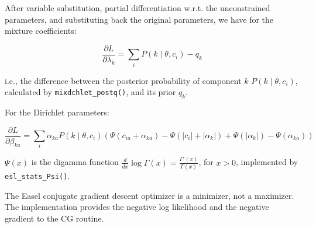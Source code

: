 \documentclass[11pt]{article}
\newcommand{\mono}[1]{{\smaller\texttt{#1}}}                    %
\begin{document}
After variable substitution, partial differentiation w.r.t. the
unconstrained parameters, and substituting back the original
parameters, we have for the mixture coefficients:

\[
  \frac{\partial L}{\partial \lambda_k} = \sum_i P(k \mid \theta, c_i) - q_k
\]

i.e., the difference between the posterior probability of component
$k$ $P(k \mid \theta, c_i)$, calculated by \mono{mixdchlet\_postq()},
and its prior $q_k$.

For the Dirichlet parameters:

\[
\frac{\partial L}{\partial \beta_{ka}}  =  \sum_i
 \alpha_{ka} P(k \mid \theta, c_i) 
    \left( \Psi \left( c_{ia} + \alpha_{ka} \right)  
        -  \Psi \left( | c_i | + | \alpha_k | \right)
        +  \Psi \left( | \alpha_k | \right) 
        -  \Psi \left( \alpha_{ka} \right) 
    \right) 
\]


$\Psi(x)$ is the digamma function $\frac{d}{dx} \log \Gamma(x) =
\frac{\Gamma'(x)}{\Gamma(x)}$, for $x > 0$, implemented by
\mono{esl\_stats\_Psi()}.

The Easel conjugate gradient descent optimizer is a minimizer, not a
maximizer.  The implementation provides the negative log likelihood
and the negative gradient to the CG routine.
\end{document}
